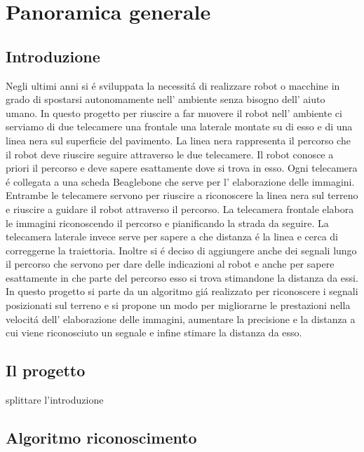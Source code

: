 \chapter{Panoramica generale}

\section{Introduzione}

	Negli ultimi anni si \'e sviluppata la necessit\'a di realizzare robot o macchine in grado di spostarsi autonomamente nell' ambiente senza bisogno dell' aiuto umano.
	In questo progetto per riuscire a far muovere il robot nell' ambiente ci serviamo di due telecamere una frontale una laterale montate su di esso e di una linea nera sul superficie del pavimento.
	La linea nera rappresenta il percorso che il robot deve riuscire seguire attraverso le due telecamere. Il robot conosce a priori il percorso e deve sapere esattamente dove si trova in esso. Ogni telecamera \'e collegata a una scheda Beaglebone che serve per l' elaborazione delle immagini. Entrambe le telecamere servono per riuscire a riconoscere la linea nera sul terreno e riuscire a guidare il robot attraverso il percorso. La telecamera frontale elabora le immagini riconoscendo il percorso e pianificando la strada da seguire. La telecamera laterale invece serve per sapere a che distanza \'e la linea e cerca di correggerne la traiettoria.
	Inoltre si \'e deciso di aggiungere anche dei segnali lungo il percorso che servono per dare delle indicazioni al robot e anche per sapere esattamente in che parte del percorso esso si trova stimandone la distanza da essi.
	In questo progetto si parte da un algoritmo gi\'a realizzato per riconoscere i segnali posizionati sul terreno e si propone un modo per migliorarne le prestazioni nella velocit\'a dell' elaborazione delle immagini, aumentare la precisione e la distanza a cui viene riconosciuto un segnale e infine stimare la distanza da esso.

\section{Il progetto}
	splittare l'introduzione

\section{Algoritmo riconoscimento}

